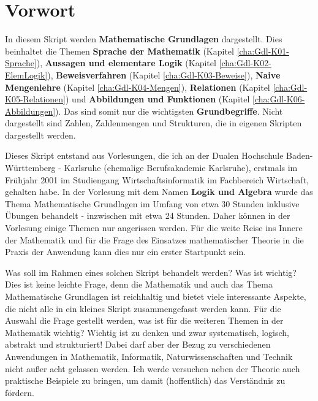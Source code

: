 \chapter*{Vorwort}

In diesem Skript werden \textbf{Mathematische Grundlagen} dargestellt. 
Dies beinhaltet die Themen 
\textbf{Sprache der Mathematik} (Kapitel \ref{cha:Gdl-K01-Sprache}),
\textbf{Aussagen und elementare Logik} (Kapitel \ref{cha:Gdl-K02-ElemLogik}),
\textbf{Beweisverfahren} (Kapitel \ref{cha:Gdl-K03-Beweise}), 
\textbf{Naive Mengenlehre} (Kapitel \ref{cha:Gdl-K04-Mengen}),
\textbf{Relationen} (Kapitel \ref{cha:Gdl-K05-Relationen}) und
\textbf{Abbildungen und Funktionen} (Kapitel \ref{cha:Gdl-K06-Abbildungen}).
Das sind somit nur die wichtigsten \textbf{Grundbegriffe}. Nicht dargestellt 
sind Zahlen, Zahlenmengen und Strukturen, die in eigenen Skripten dargestellt 
werden.

Dieses Skript entstand aus Vorlesungen, die ich an der Dualen Hochschule 
Baden-Württemberg - Karlsruhe (ehemalige Berufsakademie Karlsruhe), erstmals 
im Frühjahr 2001 im Studiengang Wirtschaftsinformatik im Fachbereich 
Wirtschaft, gehalten habe. In der Vorlesung mit dem Namen \textbf{Logik und 
Algebra} wurde das Thema Mathematische Grundlagen im Umfang von etwa 30 
Stunden inklusive Übungen behandelt - inzwischen mit etwa 24 Stunden. Daher 
können in der Vorlesung einige Themen nur angerissen werden. Für die weite 
Reise ins Innere der Mathematik und für die Frage des Einsatzes 
mathematischer Theorie in die Praxis der Anwendung kann dies nur ein 
erster Startpunkt sein.

Was soll im Rahmen eines solchen Skript behandelt werden? Was ist wichtig? 
Dies ist keine leichte Frage, denn die Mathematik und auch das Thema 
Mathematische Grundlagen ist reichhaltig und bietet viele interessante 
Aspekte, die nicht alle in ein kleines Skript zusammengefasst werden kann. 
Für die Auswahl die Frage gestellt werden, was ist für die weiteren Themen
in der Mathematik wichtig? Wichtig ist zu denken und zwar systematisch, 
logisch, abstrakt und strukturiert! Dabei darf aber der Bezug zu 
verschiedenen Anwendungen in Mathematik, Informatik, Naturwissenschaften und 
Technik nicht außer acht gelassen werden. Ich werde versuchen neben der 
Theorie auch praktische Beispiele zu bringen, um damit (hoffentlich) das 
Verständnis zu fördern.


